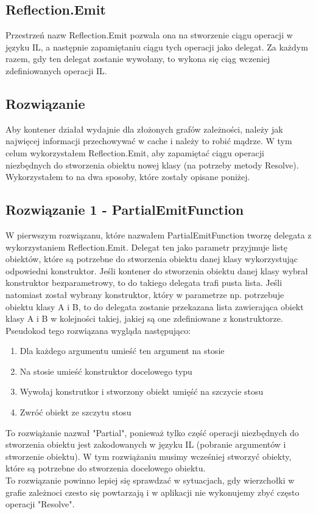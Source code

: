 \documentclass[12pt]{article}
\begin{document}
\subsection{Reflection.Emit}
Przestrzeń nazw Reflection.Emit pozwala ona na stworzenie ciągu operacji w języku IL, a następnie zapamiętaniu ciągu tych operacji jako delegat. Za każdym razem, gdy ten delegat zostanie wywołany, to wykona się ciąg wczeniej zdefiniowanych operacji IL.


\subsection{Rozwiązanie}
Aby kontener działał wydajnie dla złożonych grafów zależności, należy jak najwięcej informacji przechowywać w cache i należy to robić mądrze. W tym celum wykorzystałem Reflection.Emit, aby zapamiętać ciągu operacji niezbędnych do stworzenia obiektu nowej klasy (na potrzeby metody Resolve). Wykorzystałem to na dwa sposoby, które zostały opisane poniżej.


\subsection{Rozwiązanie 1 - PartialEmitFunction}
W pierwszym rozwiązanu, które nazwałem PartialEmitFunction tworzę delegata z wykorzystaniem Reflection.Emit. Delegat ten jako parametr przyjmuje listę obiektów, które są potrzebne do stworzenia obiektu danej klasy wykorzystując odpowiedni konstruktor. Jeśli kontener do stworzenia obiektu danej klasy wybrał konstruktor bezparametrowy, to do takiego delegata trafi pusta lista. Jeśli natomiast został wybrany konstruktor, który w parametrze np. potrzebuje obiektu klasy A i B, to do delegata zostanie przekazana lista zawierająca obiekt klasy A i B w kolejności takiej, jakiej są one zdefiniowane z konstruktorze.\\
Pseudokod tego rozwiązana wygląda następująco:
\begin{enumerate}
	\item Dla każdego argumentu umieść ten argument na stosie
	\item Na stosie umieść konstruktor docelowego typu
	\item Wywołaj konstrutkor i stworzony obiekt umięść na szczycie stosu
	\item Zwróć obiekt ze szczytu stosu
\end{enumerate}
To rozwiążanie nazwał "Partial", ponieważ tylko część operacji niezbędnych do stworzenia obiektu jest zakodowanych w języku IL (pobranie argumentów i stworzenie obiektu). W tym rozwiążaniu musimy wcześniej stworzyć obiekty, które są potrzebne do stworzenia docelowego obiektu.\\
To rozwiązanie powinno lepiej się sprawdzać w sytuacjach, gdy wierzchołki w grafie zależnoci czesto się powtarzają i w aplikacji nie wykonujemy zbyć często operacji "Resolve".
\end{document}
